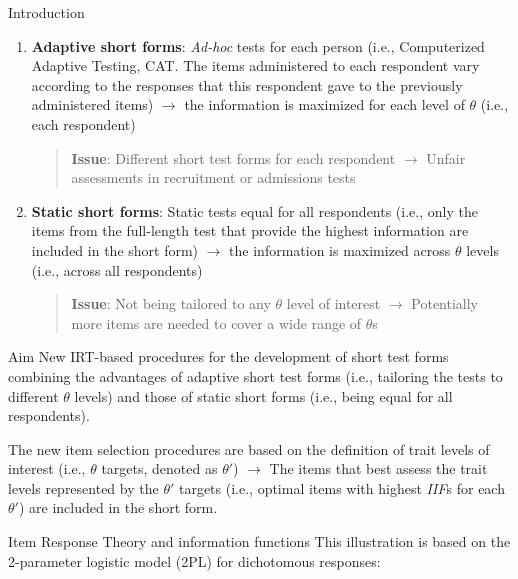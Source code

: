 \documentclass[final,t]{beamer}
\begin{document}
\begin{frame}
\begin{columns}[t]
\begin{column}{.45\linewidth}
\begin{block}{\centering Introduction}
	\begin{enumerate}
		\item \textbf{Adaptive short forms}: \emph{Ad-hoc} tests for each person (i.e., Computerized Adaptive Testing, CAT. The items administered to each respondent vary according to the responses that this respondent gave to the previously administered items) $\rightarrow$ the information is maximized for each level of $\theta$ (i.e., each respondent)
		
		\begin{quote}
			\textbf{Issue}: Different short test forms for each respondent $\rightarrow$ Unfair assessments in recruitment or admissions tests
		\end{quote}
		
		\item  \textbf{Static short forms}: Static tests equal for all respondents (i.e., only the items from the full-length test that provide the highest information are included in the short form) $\rightarrow$ the information is maximized across $\theta$ levels (i.e., across all respondents)
		
		\begin{quote}
			\textbf{Issue}: Not being tailored to any $\theta$ level of interest $\rightarrow$ Potentially more items are needed to  cover a wide range of $\theta$s
		\end{quote}
	\end{enumerate}
\end{block}    

\begin{block}{\centering Aim}
	New IRT-based procedures for the development of short test forms combining the advantages of adaptive short test forms (i.e., tailoring the tests to different $\theta$ levels) and  those of static short forms (i.e., being equal for all respondents). 
	
	The new item selection procedures are based on the definition of trait levels of interest (i.e., $\theta$ targets, denoted as $\theta'$) $\rightarrow$  The items that best assess the trait levels represented by the $\theta'$ targets (i.e., optimal items with highest \emph{IIF}s for each $\theta'$) are included in the short form.

\end{block}

\begin{block}{\centering Item Response Theory and information functions}
	This illustration is based on the 2-parameter logistic model (2PL) for dichotomous responses: 
	

\end{block}
\end{column}
\end{columns}
\end{frame}
\end{document}
